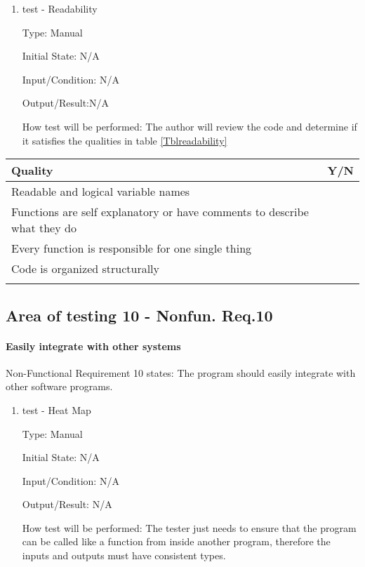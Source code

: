 \documentclass[12pt, titlepage]{article}
\begin{document}
\begin{enumerate}

\item{test - Readability\\}

Type: Manual
					
Initial State: N/A
					
Input/Condition: N/A
					
Output/Result:N/A
					
How test will be performed: The author will review the code and determine if it satisfies the qualities in table \ref{Tblreadability}
					
\end{enumerate}
\begin{table}[!h]
  \caption{Code Readability Qualities} \label{Tblreadability}
  \renewcommand{\arraystretch}{1.2}
\noindent \begin{longtable*}{l l} 
  \toprule
  Quality & Y/N\\
  \midrule 
  Readable and logical variable names & \\
  Functions are self explanatory or have comments to describe what they do & \\
  Every function is responsible for one single thing & \\
  Code is organized structurally & \\
\bottomrule \\
\end{longtable*}
\end{table}

\subsection{Area of testing 10 - Nonfun. Req.10} \label{test_system}
\paragraph{Easily integrate with other systems}

Non-Functional Requirement 10 states: The program should easily integrate with other software programs. 

\begin{enumerate}

\item{test - Heat Map\\}

Type: Manual
					
Initial State: N/A 
					
Input/Condition: N/A
					
Output/Result: N/A
					
How test will be performed: The tester just needs to ensure that the program can be called like a function from inside another program, therefore the inputs and outputs must have consistent types.
					
\end{enumerate}
\end{document}
